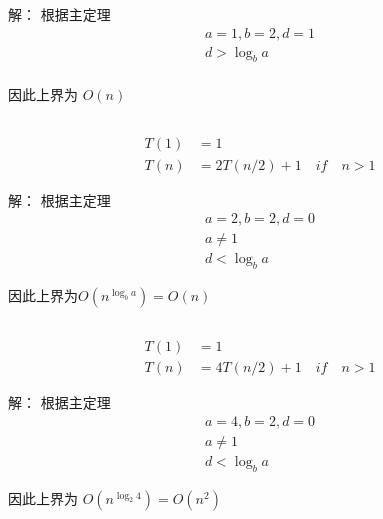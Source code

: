 解：
根据主定理
\begin{equation}
    \begin{aligned}
        a=1,b=2,d=1\\
         d > \log_{b}a \\
    \end{aligned}
    \nonumber
\end{equation}

因此上界为 $O(n)$

\subsection{}
\begin{equation}
    \begin{aligned}
        T(1) &=1\\
        T(n) &=2T(n/2)+1\quad if\quad n>1
    \end{aligned}
    \nonumber
\end{equation}

解：
根据主定理
\begin{equation}
    \begin{aligned}
        a=2,b=2,d=0\\
         a \neq 1\\
         d < \log_{b}a
    \end{aligned}
    \nonumber
\end{equation}

因此上界为$O(n^{\log_{b}a})=O(n)$

\subsection{}
\begin{equation}
    \begin{aligned}
        T(1) &=1\\
        T(n) &=4T(n/2)+1\quad if\quad n>1
    \end{aligned}
    \nonumber
\end{equation}

解：
根据主定理
\begin{equation}
    \begin{aligned}
        a=4,b=2,d=0\\
         a \neq 1\\
         d < \log_{b}a
    \end{aligned}
    \nonumber
\end{equation}

因此上界为 $O(n^{\log_{2}4})=O(n^{2})$

